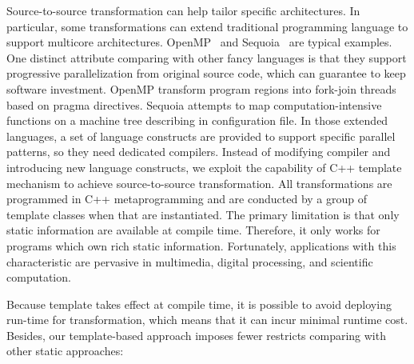\documentclass[10pt, conference, compsocconf]{IEEEtran}
\begin{document}
Source-to-source transformation can help tailor specific
architectures. In particular, some transformations can extend
traditional programming language to support multicore
architectures. OpenMP~\cite{openmp} and Sequoia~\cite{sequoia, sequoia-compiler}
are typical examples. One distinct attribute comparing with other
fancy languages is that they
support progressive parallelization from original source code, which
can guarantee to keep software investment. OpenMP transform program regions into fork-join threads based on
pragma directives. Sequoia attempts to map computation-intensive functions
on a machine tree describing in configuration file. In those
extended languages,  a set of language
constructs are provided to support specific parallel patterns, so they
need dedicated compilers. Instead of modifying compiler and introducing new language constructs, we exploit
the capability of C++ template mechanism to achieve source-to-source transformation. All
transformations are programmed in C++ metaprogramming
\cite{tempmetaprog} and are conducted by a group of template classes
when that are instantiated. The primary limitation is that only static
information are available at compile time. Therefore, it only works for programs which own rich static information. Fortunately, applications with this characteristic are pervasive in multimedia, digital processing, and scientific computation.

Because template takes effect at compile time, it is possible to avoid
deploying run-time for transformation, which means that it can incur minimal
runtime cost. Besides, our template-based approach imposes fewer restricts comparing with other static approaches:
\end{document}
